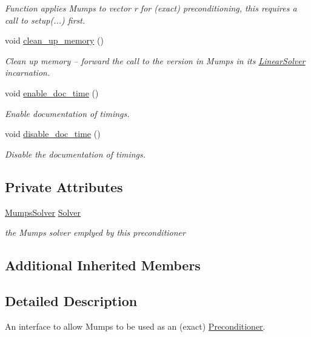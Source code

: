 \begin{DoxyCompactItemize}
\begin{DoxyCompactList}\small\item\em Function applies Mumps to vector r for (exact) preconditioning, this requires a call to setup(...) first. \end{DoxyCompactList}\item 
void \hyperlink{classoomph_1_1NewMumpsPreconditioner_a4a6cb6cc1207a765cc02ef47c6efa6e0}{clean\+\_\+up\+\_\+memory} ()
\begin{DoxyCompactList}\small\item\em Clean up memory -- forward the call to the version in Mumps in its \hyperlink{classoomph_1_1LinearSolver}{Linear\+Solver} incarnation. \end{DoxyCompactList}\item 
void \hyperlink{classoomph_1_1NewMumpsPreconditioner_a2946bc9182e015a12471a5e225473e9a}{enable\+\_\+doc\+\_\+time} ()
\begin{DoxyCompactList}\small\item\em Enable documentation of timings. \end{DoxyCompactList}\item 
void \hyperlink{classoomph_1_1NewMumpsPreconditioner_a8c01fbbb656c21c756c44be322a600b2}{disable\+\_\+doc\+\_\+time} ()
\begin{DoxyCompactList}\small\item\em Disable the documentation of timings. \end{DoxyCompactList}\end{DoxyCompactItemize}
\subsection*{Private Attributes}
\begin{DoxyCompactItemize}
\item 
\hyperlink{classoomph_1_1MumpsSolver}{Mumps\+Solver} \hyperlink{classoomph_1_1NewMumpsPreconditioner_aa51fd330deb0d4b82a43c172caa9979b}{Solver}
\begin{DoxyCompactList}\small\item\em the Mumps solver emplyed by this preconditioner \end{DoxyCompactList}\end{DoxyCompactItemize}
\subsection*{Additional Inherited Members}


\subsection{Detailed Description}
An interface to allow Mumps to be used as an (exact) \hyperlink{classoomph_1_1Preconditioner}{Preconditioner}. 

